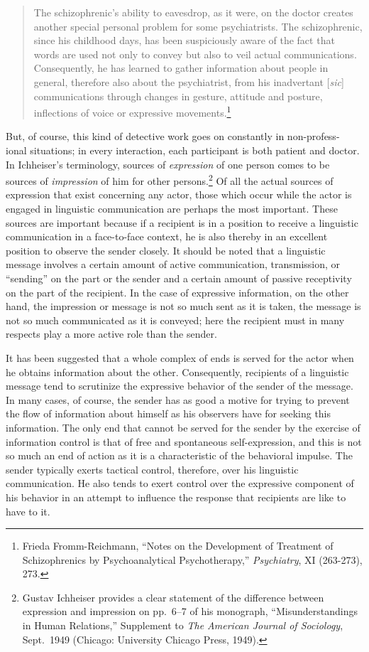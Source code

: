 \documentclass[twoside,symmetric,nobib,justified]{tufte-book}
\begin{document}
\begin{quote}
The schizophrenic's ability to eavesdrop, as it were, on the doctor
creates another special personal problem for some psychiatrists. The
schizophrenic, since his childhood days, has been suspiciously aware of
the fact that words are used not only to convey but also to veil actual
communications. Consequently, he has learned to gather information about
people in general, therefore also about the psychiatrist, from his
inadvertant {[}\emph{sic}{]} communications through changes in ges­ture,
attitude and posture, inflections of voice or expres­sive
movements.\footnote{Frieda Fromm-Reichmann, ``Notes on the Development
  of Treatment of Schizophrenics by Psychoanalytical Psychotherapy,''
  \emph{Psychiatry}, XI (263-273), 273.}
\end{quote}

\noindent But, of course, this kind of detective work goes on constantly in
non-profess- ional situations; in every interaction, each participant is
both patient and doctor. In Ichheiser's terminology, sources of
\emph{expression} of one person comes to be sources of \emph{impression}
of him for other persons.\footnote{Gustav Ichheiser provides a clear
  statement of the difference between expression and impression on
  pp.~6--7 of his mono­graph, ``Misunderstandings in Human Relations,''
  Supplement to \emph{The American Journal of Sociology}, Sept.~1949
  (Chicago: University Chicago Press, 1949).} Of all the actu­al sources
of expression that exist concerning any actor, those which occur while
the actor is engaged in linguistic communication are perhaps the most
important. These sources are important because if a recipient is in a
position to receive a linguistic communication in a face-to-face
context, he is also thereby in an excellent position to observe the
sender closely. It should be noted that a linguistic message involves a
certain amount of ac­tive communication, transmission, or ``sending'' on
the part or the sender and a certain amount of passive receptivity on
the part of the recipient. In the case of expressive information, on the
other hand, the impression or message is not so much sent as it is
taken, the message is not so much communicated as it is conveyed; here
the recipient must in many respects play a more active role than the
sender.

It has been suggested that a whole complex of ends is served for the
actor when he obtains information about the other. Consequently,
recipients of a linguistic message tend to scruti­nize the expressive
behavior of the sender of the message. In many cases, of course, the
sender has as good a motive for try­ing to prevent the flow of
information about himself as his ob­servers have for seeking this
information. The only end that cannot be served for the sender by the
exercise of information control is that of free and spontaneous
self-expression, and this is not so much an end of action as it is a
characteristic of the behavioral impulse. The sender typically exerts
tactical con­trol, therefore, over his linguistic communication. He also
tends to exert control over the expressive component of his be­havior in
an attempt to influence the response that recipients are like to have to
it.
\end{document}
